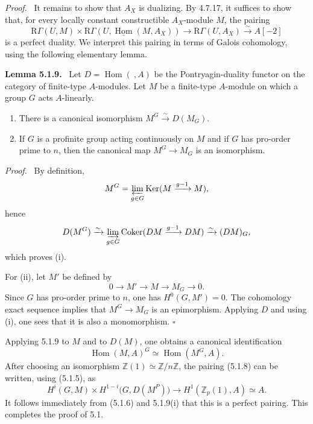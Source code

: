 \documentclass[12pt]{article}
\newcommand{\ZZ}{\mathbb Z}
\newcommand{\Hom}{\operatorname{Hom}}
\newcommand{\Ker}{\operatorname{Ker}}
\newcommand{\Coker}{\operatorname{Coker}}
\newcommand{\R}{\mathrm R}
\newcommand{\qedtext}{\hfill$\square$}
\newenvironment{statement}[1]{\par\medskip\noindent\textbf{#1.}\ }{\par\medskip}
\newenvironment{prooftext}[1][Proof]{\par\noindent\emph{#1.}\ }{\par\medskip}
\begin{document}
\begin{prooftext}
It remains to show that $A_X$ is dualizing. By 4.7.17, it suffices to show that, for every locally constant constructible $A_X$-module $M$, the pairing
\[
   \R\Gamma(U,M)\times \R\Gamma(U,\underline{\Hom}(M,A_X))
      \longrightarrow \R\Gamma(U,A_X)\xrightarrow{\sim}A[-2]\tag{5.1.8}
\]
is a perfect duality. We interpret this pairing in terms of Galois cohomology, using the following elementary lemma.
\end{prooftext}

\begin{statement}{Lemma 5.1.9}
Let $D=\Hom(\ ,A)$ be the Pontryagin-duality functor on the category of finite-type $A$-modules. Let $M$ be a finite-type $A$-module on which a group $G$ acts $A$-linearly.
\begin{enumerate}[label=(\roman*)]
\item There is a canonical isomorphism $M^G\xrightarrow{\sim}D(M_G)$.
\item If $G$ is a profinite group acting continuously on $M$ and if $G$ has pro-order prime to $n$, then the canonical map $M^G\to M_G$ is an isomorphism.
\end{enumerate}
\end{statement}

\begin{prooftext}
By definition,
\[
   M^G=\varprojlim_{g\in G}\Ker(M\xrightarrow{g-1}M),
\]
hence
\[
   D(M^G)\xrightarrow{\sim}\varinjlim_{g\in G}
        \Coker(DM\xrightarrow{g-1}DM)
      \xrightarrow{\sim}(DM)_G,
\]
which proves (i).

For (ii), let $M'$ be defined by
\[
   0\longrightarrow M'\longrightarrow M\longrightarrow M_G\longrightarrow0.
\]
Since $G$ has pro-order prime to $n$, one has $H^0(G,M')=0$. The cohomology exact sequence implies that $M^G\to M_G$ is an epimorphism. Applying $D$ and using (i), one sees that it is also a monomorphism. \qedtext
\end{prooftext}

Applying 5.1.9 to $M$ and to $D(M)$, one obtains a canonical identification
\[
   \Hom(M,A)^G\simeq \Hom(M^G,A).
\]
After choosing an isomorphism $\ZZ(1)\simeq\ZZ/n\ZZ$, the pairing (5.1.8) can be written, using (5.1.5), as
\[
   H^i(G,M)\times H^{1-i}\bigl(G,D(M^P)\bigr)
      \longrightarrow H^1(\ZZ_p(1),A)\simeq A.\tag{5.1.8'}
\]
It follows immediately from (5.1.6) and 5.1.9(i) that this is a perfect pairing. This completes the proof of 5.1.
\end{document}
